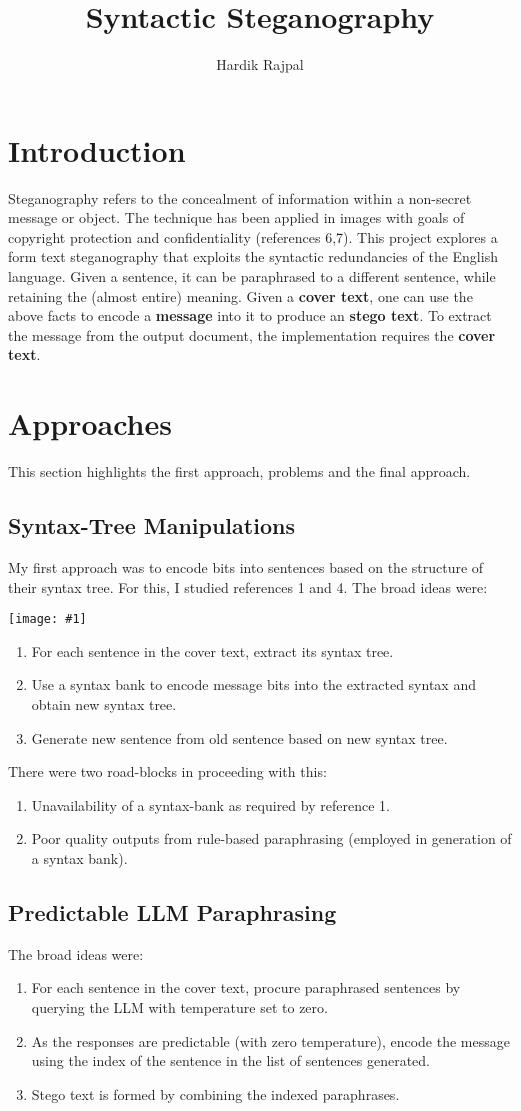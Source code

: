 \documentclass{article}
\author{Hardik Rajpal}
\title{Syntactic Steganography}
\makeatletter
\def\maxwidth#1{\ifdim\Gin@nat@width>#1 #1\else\Gin@nat@width\fi}
\newcommand{\mygraphic}[1]{
\begin{center}
    \texttt{[image: \#1]}
\end{center}
}
\makeatother
\begin{document}
\maketitle
\section{Introduction}
Steganography refers to the concealment of information within a non-secret message or object. The technique has been applied in images with goals of copyright protection and confidentiality (references 6,7). This project explores a form text steganography that exploits the syntactic redundancies of the English language. Given a sentence, it can be
paraphrased to a different sentence, while retaining the (almost entire) meaning. Given a \textbf{cover text}, one can use the above facts to encode a \textbf{message} into it to produce an \textbf{stego text}. To extract the message from the output document, the implementation requires the \textbf{cover text}.
\section{Approaches}
This section highlights the first approach, problems and the final approach.
\subsection{Syntax-Tree Manipulations}
My first approach was to encode bits into sentences based on the structure of their syntax tree. For this, I studied references 1 and 4. The broad ideas were:
\mygraphic{rsrc/syntaxtree.png}
\begin{enumerate}
\item For each sentence in the cover text, extract its syntax tree.
\item Use a syntax bank to encode message bits into the extracted syntax and obtain new syntax tree.
\item Generate new sentence from old sentence based on new syntax tree.
\end{enumerate}
There were two road-blocks in proceeding with this:
\begin{enumerate}
\item Unavailability of a syntax-bank as required by reference 1.
\item Poor quality outputs from rule-based paraphrasing (employed in generation of a syntax bank).
\end{enumerate}
\subsection{Predictable LLM Paraphrasing}
The broad ideas were:
\begin{enumerate}
\item For each sentence in the cover text, procure paraphrased sentences by querying the LLM with temperature set to zero.
\item As the responses are predictable (with zero temperature), encode the message using the index of the sentence in the list of sentences generated.
\item Stego text is formed by combining the indexed paraphrases.
\end{enumerate}
\end{document}
